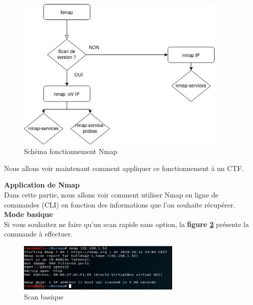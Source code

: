 \begin{figure}[htp!]
  \centering
  \setlength\figureheight{7cm}
  \setlength\figurewidth{9cm}
  \includegraphics[width=0.9\textwidth]{oui/images/nmap/basenmapdiag.png}
  \caption{Schéma fonctionnement Nmap}
  \label{fig:fonctionnementnmap}
\end{figure}

Nous allons voir maintenant comment appliquer ce fonctionnement à un CTF.

\noindent \textbf{Application de Nmap}\\

Dans cette partie, nous allons voir comment utiliser Nmap en ligne de commandes (CLI) en fonction des informations que l'on souhaite récupérer.\\

\noindent \textbf{Mode basique}\\

Si vous souhaitez ne faire qu'un scan rapide sans option, la \textbf{figure \ref{fig:scanbasique}} présente la commande à effectuer.

\begin{figure}[htp!]
  \centering
  \setlength\figureheight{7cm}
  \setlength\figurewidth{9cm}
  \includegraphics[width=0.7\textwidth]{oui/Ancien/imangeancien/Nmap/justeip.PNG}
  \caption{Scan basique}
  \label{fig:scanbasique}
\end{figure}

